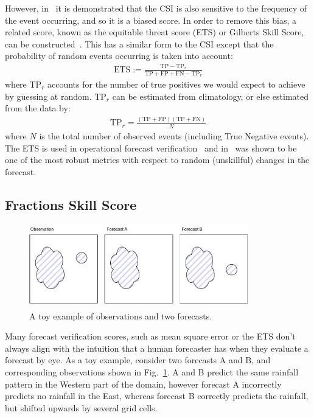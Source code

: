 \documentclass[../main.tex]{subfiles}
\begin{document}
However, in~\cite{schaefer_critical_1990} it is demonstrated that the CSI is also sensitive to the frequency of the event occurring, and so it is a biased score. In order to remove this bias, a related score, known as the equitable threat score (ETS) or Gilberts Skill Score, can be constructed~\citep{schaefer_critical_1990, wilks_forecast_2019}. This has a similar form to the CSI except that the probability of random events occurring is taken into account:
\begin{align}
\label{eq:ets}
\text{ETS} := \frac{\text{TP} - \text{TP}_{r}}{\text{TP} + \text{FP} + \text{FN} - \text{TP}_{r}}
\end{align}
where $\text{TP}_{r}$ accounts for the number of true positives we would expect to achieve by guessing at random. $\text{TP}_{r}$ can be estimated from climatology, or else estimated from the data by:
\begin{align}
    \text{TP}_{r} = \frac{(\text{TP} + \text{FP})(\text{TP} + \text{FN})}{N}
\end{align}
where $N$ is the total number of observed events (including True Negative events). The ETS is used in operational forecast verification~\citep{mittermaier_long-term_2013} and in~\cite{manzato_behaviour_2017} was shown to be one of the most robust metrics with respect to random (unskillful) changes in the forecast.

\subsection{Fractions Skill Score}
\label{metrics:fss}


\begin{figure}[h]
     \centering
     \includegraphics[width=0.85\textwidth]{images/double_penalty.pdf}
     
     \caption{A toy example of observations and two forecasts.}
     \label{fig:double_penalty}
\end{figure}

Many forecast verification scores, such as mean square error or the ETS don't always align with the intuition that a human forecaster has when they evaluate a forecast by eye. As a toy example, consider two forecasts A and B, and corresponding observations shown in Fig.~\ref{fig:double_penalty}. A and B predict the same rainfall pattern in the Western part of the domain, however forecast A incorrectly predicts no rainfall in the East, whereas forecast B correctly predicts the rainfall, but shifted upwards by several grid cells.
\end{document}
